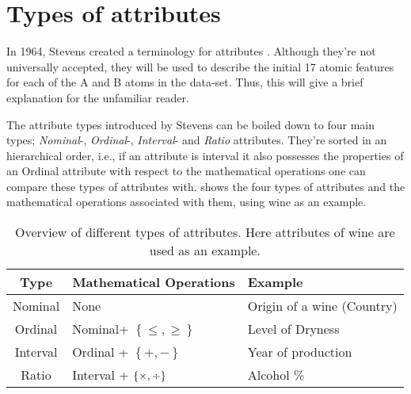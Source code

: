 \newpage
\chapter{Types of attributes}\label{chap:attribute_types}
\thispagestyle{empty}

In 1964, Stevens created a terminology for attributes \citep{Stevens677}. Although they're not universally accepted, they will be used to describe the initial 17 atomic features for each of the A and B atoms in the data-set. Thus, this  will give a brief explanation for the unfamiliar reader.

The attribute types introduced by Stevens can be boiled down to four main types; \emph{Nominal}-, \emph{Ordinal}-, \emph{Interval}- and \emph{Ratio} attributes. They're sorted in an hierarchical order, i.e., if an attribute is interval it also possesses the properties of an Ordinal attribute with respect to the mathematical operations one can compare these types of attributes with.  shows the four types of attributes and the mathematical operations associated with them, using wine as an example.

\begin{table}[ht!]
    \centering
    \begin{tabular}{c p{5cm} p{6cm}}
        \toprule
        \textbf{Type} & \textbf{Mathematical Operations} & \textbf{Example}\\ \toprule
        Nominal & None & Origin of a wine (Country) \\ 
        Ordinal & Nominal+ $\left\{ \leq, \geq \right\}$ & Level of Dryness  \\ 
        Interval & Ordinal + $\left\{ +,-\right\}$ & Year of production \\
        Ratio & Interval + $\left\{ \times,\text{\textdiv} \right\}$ & Alcohol \% \\ \bottomrule
    \end{tabular}
    \caption[Types of attributes]{Overview of different types of attributes. Here attributes of wine are used as an example.}
    \label{tab:attribute_types}
\end{table}

